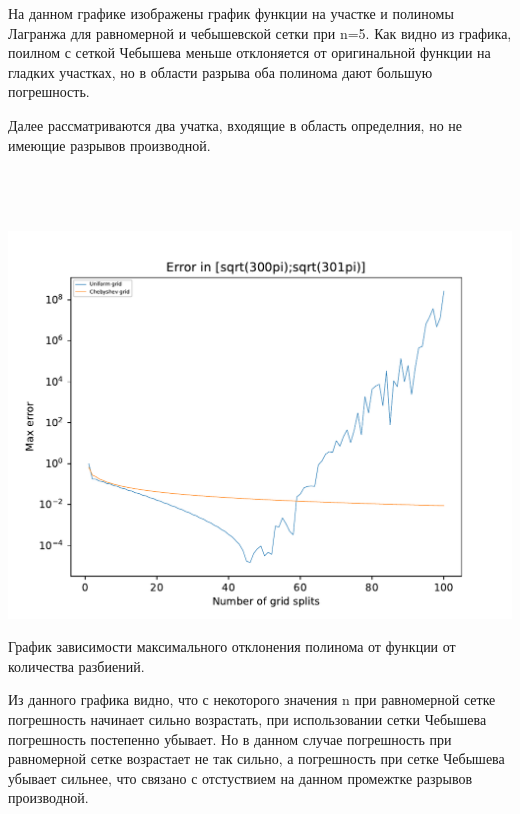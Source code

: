 На данном графике изображены график функции на участке и полиномы Лагранжа для равномерной и чебышевской сетки при n=5. Как видно из графика, поилном с сеткой Чебышева меньше отклоняется от оригинальной функции на гладких участках, но в области разрыва оба полинома дают большую погрешность.

Далее рассматриваются два учатка, входящие в область определния, но не имеющие разрывов производной.

\subsection{ \begin{math} 
		[\sqrt{300*\pi}; \sqrt{301*\pi}]
	\end{math}}

\includegraphics[scale=0.75]{5.pdf}

График зависимости максимального отклонения полинома от функции от количества разбиений. 

Из данного графика видно, что с некоторого значения n при равномерной сетке погрешность начинает сильно возрастать, при использовании сетки Чебышева погрешность постепенно убывает. Но в данном случае погрешность при равномерной сетке возрастает не так сильно, а погрешность при сетке Чебышева убывает сильнее, что связано с отстуствием на данном промежтке разрывов производной.


